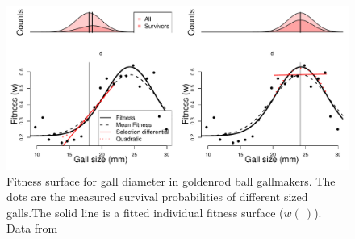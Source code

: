 \begin{figure}
\begin{center}
\includegraphics[width= \textwidth]{Journal_figs/Quant_gen/Weis_Gorman_gall_size_stablizing_sel/gall_size.pdf}
\end{center}
\caption{Fitness surface for gall diameter in goldenrod
ball gallmakers. The dots are the measured survival probabilities of
  different sized galls.The solid line is a fitted individual fitness
  surface ($w(~)$).  Data from \citet{weis1990measuring} } \label{gall_size_stab}
\end{figure}




 


 

